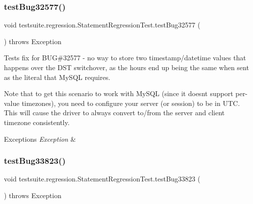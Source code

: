 \subsubsection{\texorpdfstring{test\+Bug32577()}{testBug32577()}}
{\footnotesize\ttfamily void testsuite.\+regression.\+Statement\+Regression\+Test.\+test\+Bug32577 (\begin{DoxyParamCaption}{ }\end{DoxyParamCaption}) throws Exception}

Tests fix for B\+UG\#32577 -\/ no way to store two timestamp/datetime values that happens over the D\+ST switchover, as the hours end up being the same when sent as the literal that My\+S\+QL requires.

Note that to get this scenario to work with My\+S\+QL (since it doesn\textquotesingle{}t support per-\/value timezones), you need to configure your server (or session) to be in U\+TC. This will cause the driver to always convert to/from the server and client timezone consistently.


\begin{DoxyExceptions}{Exceptions}
{\em Exception} & \\
\hline
\end{DoxyExceptions}
\mbox{\label{classtestsuite_1_1regression_1_1_statement_regression_test_a5d8cd5c61277cdedeb6ba9bb4626f26e}} 
\subsubsection{\texorpdfstring{test\+Bug33823()}{testBug33823()}}
{\footnotesize\ttfamily void testsuite.\+regression.\+Statement\+Regression\+Test.\+test\+Bug33823 (\begin{DoxyParamCaption}{ }\end{DoxyParamCaption}) throws Exception}

\mbox{\label{classtestsuite_1_1regression_1_1_statement_regression_test_accd5c83c1b95ec64b7d7868f9ea2be99}} 
